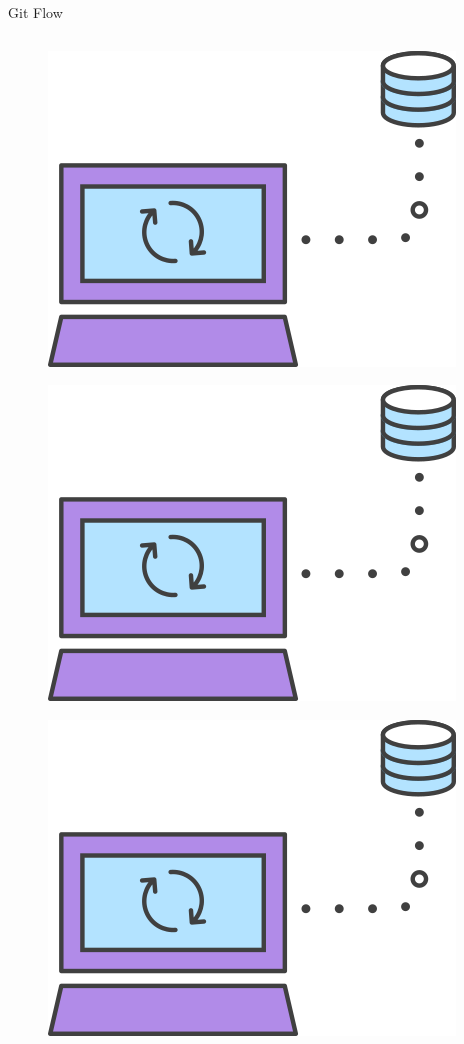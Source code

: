 \documentclass[xcolor=dvipsnames,t]{beamer}
\begin{document}
\begin{frame}[fragile]{Git Flow}
\begin{columns}[t]
	\begin{column}{.2\textwidth}
		\begin{figure}
			\centering			
			\includegraphics[width=0.6\linewidth]{figures/gitsync}
		\end{figure}	
		\begin{figure}
			\centering			
			\includegraphics[width=0.6\linewidth]{figures/gitsync}
		\end{figure}
		\begin{figure}
			\centering			
			\includegraphics[width=0.6\linewidth]{figures/gitsync}
		\end{figure}
	\end{column}
\end{columns}

\end{frame}
\end{document}
